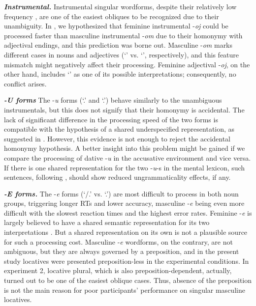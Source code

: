 \documentclass[output=paper, modfonts,newtxmath,hidelinks]{langscibook}
\begin{document}
\textbf{\textit{Instrumental.}} Instrumental singular wordforms, despite their relatively low frequency \citep{samojlova2014frequencies}, are one of the easiest obliques to be recognized due to their unambiguity. In , we hypothesized that feminine instrumental -\textit{oj} could be processed faster than masculine instrumental -\textit{om} due to their homonymy with adjectival endings, and this prediction was borne out. Masculine -\textit{om} marks different cases in nouns and adjectives (`\ins' vs. `\locc', respectively), and this feature mismatch might negatively affect their processing. Feminine adjectival -\textit{oj}, on the other hand, includes `\ins' as one of its possible interpretations; consequently, no conflict arises.

\textbf{\textit{-U forms}} The -\textit{u} forms (`\accc.\fem' and `\datt.\masc') behave similarly to the unambiguous instrumentals, but this does not signify that their homonymy is accidental. The lack of significant difference in the processing speed of the two forms  is compatible with the hypothesis of a shared underspecified representation, as suggested in  \citet{muller2004decomposing,wunderlich2004there}. However, this evidence is not enough to reject the accidental homonymy hypothesis. A better insight into this problem might be gained if we compare the processing of dative -\textit{u} in the accusative environment and vice versa. If there is one shared representation for the two -\textit{u}-s in the mental lexicon, such sentences, following \citet{penke2004psycholinguistic, opitz2013neurophysiological}, should show reduced ungrammaticality effects, if any.

\textbf{\textit{-E forms.}} The -\textit{e} forms (`\datt/\locc.\fem' vs. `\locc.\masc') are most difficult to process in both noun groups, triggering longer RTs and lower accuracy, masculine -\textit{e} being even more difficult with the slowest reaction times and the highest error rates. Feminine -\textit{e} is largely believed to have a shared semantic representation for its two interpretations \citep{muller2004decomposing, wiese2004categories, wunderlich2004there}. But a shared representation on its own is not a plausible source for such a processing cost. Masculine -\textit{e} wordforms, on the contrary, are not ambiguous, but they are always governed by a preposition, and in the present study locatives were presented preposition-less in the experimental conditions. In experiment 2, locative plural, which is also preposition-dependent, actually, turned out to be one of the easiest oblique cases. Thus, absence of the preposition is not the main reason for poor participants’ performance on singular masculine locatives. 
\end{document}
